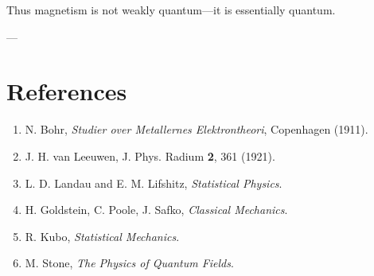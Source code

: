 \documentclass[11pt]{article}
\begin{document}
Thus magnetism is not weakly quantum—it is essentially quantum.

---

\section*{References}

\begin{enumerate}
\item N. Bohr, \textit{Studier over Metallernes Elektrontheori}, Copenhagen (1911).
\item J. H. van Leeuwen, J. Phys. Radium \textbf{2}, 361 (1921).
\item L. D. Landau and E. M. Lifshitz, \textit{Statistical Physics}.
\item H. Goldstein, C. Poole, J. Safko, \textit{Classical Mechanics}.
\item R. Kubo, \textit{Statistical Mechanics}.
\item M. Stone, \textit{The Physics of Quantum Fields}.
\end{enumerate}
\end{document}
